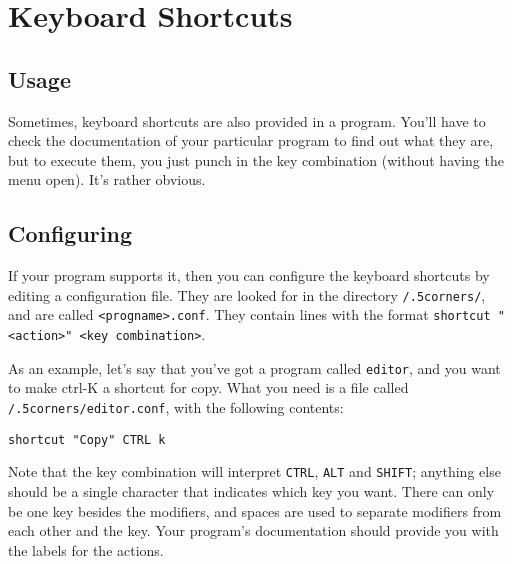 \section{Keyboard Shortcuts}


\subsection{Usage}

Sometimes, keyboard shortcuts are also provided in a \fc{} program.  You'll
have to check the documentation of your particular program to find out what
they are, but to execute them, you just punch in the key combination (without
having the \fc{} menu open).  It's rather obvious.


\subsection{Configuring}

If your program supports it, then you can configure the keyboard shortcuts by
editing a configuration file.  They are looked for in the directory
\texttt{/.5corners/}, and are called \texttt{<progname>.conf}.
They contain lines with the format \texttt{shortcut "<action>" <key
combination>}.

As an example, let's say that you've got a program called \texttt{editor}, and
you want to make ctrl-K a shortcut for copy.  What you need is a file called
\texttt{/.5corners/editor.conf}, with the following contents:

\begin{verbatim}
shortcut "Copy" CTRL k
\end{verbatim}

Note that the key combination will interpret \texttt{CTRL}, \texttt{ALT} and
\texttt{SHIFT}; anything else should be a single character that indicates
which key you want.  There can only be one key besides the modifiers, and
spaces are used to separate modifiers from each other and the key.  Your
program's documentation should provide you with the labels for the actions.
